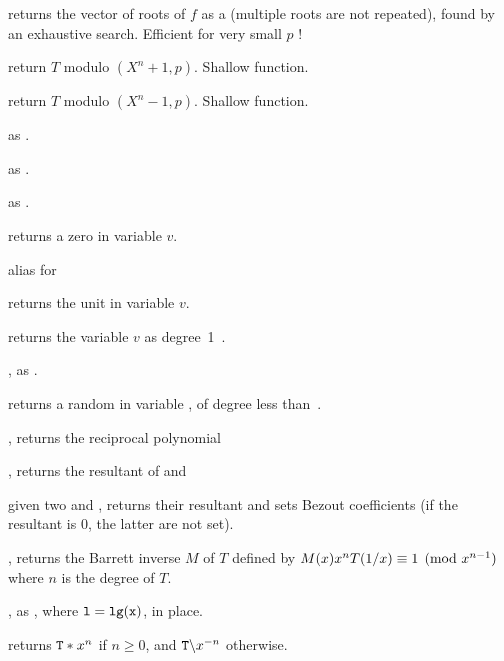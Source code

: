  returns the vector of roots
of $f$ as a  (multiple roots are not repeated), found
by an exhaustive search. Efficient for very small $p$ !


 return $T$ modulo
$(X^n + 1, p)$. Shallow function.

 return $T$ modulo
$(X^n - 1, p)$. Shallow function.

 as .

 as
.

 as .


 returns a zero  in variable $v$.

 alias for 

 returns the unit  in variable $v$.

 returns the variable $v$ as degree~1~.

, as .

 returns a random 
in variable , of degree less than~.

, returns the reciprocal polynomial

, returns the resultant
of  and 

given two   and ,
returns their resultant and sets Bezout coefficients (if the resultant is 0,
the latter are not set).

, returns the Barrett inverse
$M$ of $T$ defined by $M(x)\*x^n\*T(1/x)\equiv 1\pmod{x^{n-1}}$ where $n$ is
the degree of $T$.

, as , where
${\tt l} = {\tt lg(x)}$, in place.

 returns ${\tt T} * x^n$ if $n\geq 0$,
and $\kbd{T} \bs x^{-n}$ otherwise.

